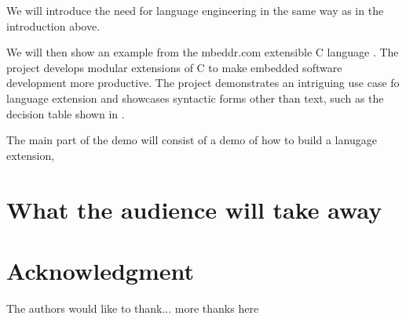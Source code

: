 \documentclass[10pt, conference, compsocconf]{IEEEtran}
\begin{document}
 We will introduce the need for language engineering in
the same way as in the introduction above. 

 We will then show an example from the mbeddr.com
extensible C language \cite{mbeddr}. The project develops modular extensions of
C to make embedded software development more productive. The project
demonstrates an intriguing use case fo language extension and showcases
syntactic forms other than text, such as the decision table shown in
.

 The main part of the demo will consist of a demo of how
to build a lanugage extension,


\section{What the audience will take away}



%
\IEEEpeerreviewmaketitle






\section*{Acknowledgment}


The authors would like to thank...
more thanks here




%
%
%

 







\end{document}
